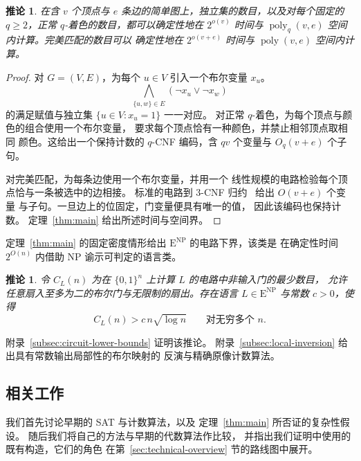 \documentclass[11pt,reqno]{amsart}
\numberwithin{equation}{section}
\newtheorem{corollary}[theorem]{推论}
\theoremstyle{definition}\newtheorem{definition}[theorem]{定义}
\theoremstyle{remark}\newtheorem{remark}[theorem]{注}
\newcommand{\poly}{\operatorname{poly}}
\renewcommand{\ge}{\geqslant}
\begin{document}
\begin{corollary}\label{cor:graph-counting}
在含 $v$ 个顶点与 $e$ 条边的简单图上，独立集的数目，以及对每个固定的 $q\ge2$，正常
$q$-着色的数目，都可以确定性地在 $2^{o(v)}$ 时间与
$\poly_q(v,e)$ 空间内计算。完美匹配的数目可以
确定性地在 $2^{o(v+e)}$ 时间与 $\poly(v,e)$ 空间内计算。
\end{corollary}
\begin{proof}
对 $G=(V,E)$，为每个 $u\in V$ 引入一个布尔变量 $x_u$。
\[
 \bigwedge_{\{u,w\}\in E}(\neg x_u\vee\neg x_w)
\]
的满足赋值与独立集 $\{u\in V:x_u=1\}$ 一一对应。
对正常 $q$-着色，为每个顶点与颜色的组合使用一个布尔变量，
要求每个顶点恰有一种颜色，并禁止相邻顶点取相同
颜色。这给出一个保持计数的
$q$-CNF 编码，含 $qv$ 个变量与 $O_q(v+e)$ 个子句。

对完美匹配，为每条边使用一个布尔变量，并用一个
线性规模的电路检验每个顶点恰与一条被选中的边相接。
标准的电路到 $3$-CNF
归约~\cite[引理~15.9--15.10]{Bar23} 给出 $O(v+e)$ 个变量
与子句。一旦边上的位固定，门变量便具有唯一的值，
因此该编码也保持计数。
定理~\ref{thm:main} 给出所述时间与空间界。
\end{proof}

定理~\ref{thm:main} 的固定密度情形给出
$\mathrm E^{\mathrm{NP}}$ 的电路下界，该类是
在确定性时间 $2^{O(n)}$ 内借助 NP 谕示可判定的语言类。

\begin{corollary}\label{cor:quantitative-circuits}
令 $C_L(n)$ 为在 $\{0,1\}^n$ 上计算 $L$ 的电路中非输入门的最少数目，
允许任意扇入至多为二的布尔门与无限制的扇出。存在语言
$L\in\mathrm E^{\mathrm{NP}}$ 与常数 $c>0$，使得
\begin{equation}\label{eq:quantitative-circuit-lower-bound}
 C_L(n)>c\,n\sqrt{\log n}\qquad\text{对无穷多个 }n.
\end{equation}
\end{corollary}

附录~\ref{subsec:circuit-lower-bounds} 证明该推论。
附录~\ref{subsec:local-inversion} 给出具有常数输出局部性的布尔映射的
反演与精确原像计数算法。

\subsection{相关工作}\label{sec:related}
我们首先讨论早期的 SAT 与计数算法，以及
定理~\ref{thm:main} 所否证的复杂性假设。
随后我们将自己的方法与早期的代数算法作比较，
并指出我们证明中使用的既有构造，它们的角色
在第~\ref{sec:technical-overview} 节的路线图中展开。
\end{document}
